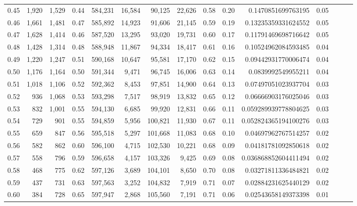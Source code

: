 \begin{tabular}{rrrrrrrrrrrrrrr}
0.45 &   1,920 &  1,529 &  0.44 &  584,231 &   16,584 &   90,125 &   22,626 &  0.58 &  0.20 &      0.1470851699763195 &      0.05 \\
0.46 &   1,661 &  1,481 &  0.47 &  585,892 &   14,923 &   91,606 &   21,145 &  0.59 &  0.19 &     0.13235359331624552 &      0.05 \\
0.47 &   1,628 &  1,414 &  0.46 &  587,520 &   13,295 &   93,020 &   19,731 &  0.60 &  0.17 &     0.11791469698716642 &      0.05 \\
0.48 &   1,428 &  1,314 &  0.48 &  588,948 &   11,867 &   94,334 &   18,417 &  0.61 &  0.16 &     0.10524962084593485 &      0.04 \\
0.49 &   1,220 &  1,247 &  0.51 &  590,168 &   10,647 &   95,581 &   17,170 &  0.62 &  0.15 &     0.09442931770006474 &      0.04 \\
0.50 &   1,176 &  1,164 &  0.50 &  591,344 &    9,471 &   96,745 &   16,006 &  0.63 &  0.14 &      0.0839992549955211 &      0.04 \\
0.51 &   1,018 &  1,106 &  0.52 &  592,362 &    8,453 &   97,851 &   14,900 &  0.64 &  0.13 &     0.07497051023937704 &      0.03 \\
0.52 &     936 &  1,068 &  0.53 &  593,298 &    7,517 &   98,919 &   13,832 &  0.65 &  0.12 &     0.06666903176025046 &      0.03 \\
0.53 &     832 &  1,001 &  0.55 &  594,130 &    6,685 &   99,920 &   12,831 &  0.66 &  0.11 &    0.059289939778804625 &      0.03 \\
0.54 &     729 &    901 &  0.55 &  594,859 &    5,956 &  100,821 &   11,930 &  0.67 &  0.11 &    0.052824365194100276 &      0.03 \\
0.55 &     659 &    847 &  0.56 &  595,518 &    5,297 &  101,668 &   11,083 &  0.68 &  0.10 &     0.04697962767514257 &      0.02 \\
0.56 &     582 &    862 &  0.60 &  596,100 &    4,715 &  102,530 &   10,221 &  0.68 &  0.09 &     0.04181781092850618 &      0.02 \\
0.57 &     558 &    796 &  0.59 &  596,658 &    4,157 &  103,326 &    9,425 &  0.69 &  0.08 &    0.036868852604411494 &      0.02 \\
0.58 &     468 &    775 &  0.62 &  597,126 &    3,689 &  104,101 &    8,650 &  0.70 &  0.08 &     0.03271811336484821 &      0.02 \\
0.59 &     437 &    731 &  0.63 &  597,563 &    3,252 &  104,832 &    7,919 &  0.71 &  0.07 &     0.02884231625440129 &      0.02 \\
0.60 &     384 &    728 &  0.65 &  597,947 &    2,868 &  105,560 &    7,191 &  0.71 &  0.06 &     0.02543658149373398 &      0.01 \\

\end{tabular}
